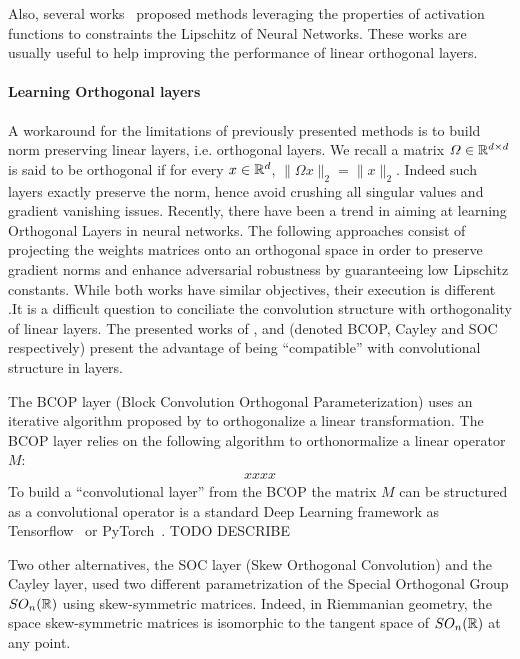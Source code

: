 Also, several works~\cite{anil2019sorting,singla2021householder,huang2021local} proposed methods leveraging the properties of activation functions to constraints the Lipschitz of Neural Networks. These works are usually useful to help  improving the performance of linear orthogonal layers.



\paragraph{Learning Orthogonal layers} A workaround for the limitations of previously presented methods is to build norm preserving linear layers, i.e. orthogonal layers. We recall a matrix $\Omega\in\mathbb{R}^{d\times d}$ is said to be orthogonal if for every $x\in\mathbb{R}^d$, $\lVert\Omega x\rVert_2 = \lVert x\rVert_2$. Indeed such layers exactly preserve the norm, hence avoid crushing all singular values and gradient vanishing issues. Recently, there have been a trend in aiming at learning Orthogonal Layers in neural networks.  The following approaches consist of projecting the weights matrices onto an orthogonal space in order to preserve gradient norms and enhance adversarial robustness by guaranteeing low Lipschitz constants. While both works have similar objectives, their execution is different .It is a difficult question to conciliate the convolution structure with orthogonality of linear layers. The presented works of \citet{li2019preventing}, \citet{trockman2021orthogonalizing} and \citet{skew2021sahil} (denoted BCOP, Cayley and SOC respectively) present the advantage of being ``compatible''  with convolutional structure in layers. 

The BCOP layer (Block Convolution Orthogonal Parameterization) uses an iterative algorithm proposed by \citet{bjorck1971iterative} to orthogonalize a linear transformation. The BCOP layer relies on the following algorithm to orthonormalize a linear operator $M$:
\begin{align*}
    xxxx
\end{align*}
To build a ``convolutional layer'' from the BCOP the matrix $M$ can be structured as a convolutional operator is a standard Deep Learning framework as Tensorflow~\citep{abadi2016deep} or PyTorch~\citep{paszke2019pytorch}. TODO DESCRIBE

Two other alternatives, the SOC layer (Skew Orthogonal Convolution) and the Cayley layer, used two different parametrization of the Special Orthogonal Group $SO_n(\mathbb{R})$ using skew-symmetric matrices. Indeed, in Riemmanian geometry, the space skew-symmetric matrices is isomorphic to the tangent space of $SO_n(\mathbb{R})$ at any point. 

